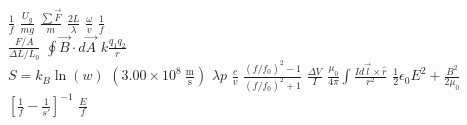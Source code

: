 \documentclass{article}
\begin{document}
$\frac{1}{f}$
$\frac{U_g}{mg}$
$\frac{\sum \vec F}{m}$
$\frac{2L}{\lambda}$
$\frac{\omega}{v}$
$\frac{1}{f}$ \\
$\frac{F/A}{\Delta L/L_0}$
$\oint \vec B \cdot d\vec A$
$k \frac{q_1 q_2}{r}$ \\
$S = k_B \ln(w)$
$(3.00 \times 10^8~\mathrm{\frac m s})$
$\lambda p$
$\frac{c}{v}$
$\frac{(f/f_0)^2 - 1}{(f/f_0)^2 + 1}$
$\frac{\Delta V}{I}$
$\frac{\mu_0}{4\pi} \int\frac{I d\vec l \times \hat r}{r^2}$
$\frac 1 2 \epsilon_0 E^2 + \frac{B^2}{2\mu_0}$
$\left[ \frac{1}{f} - \frac{1}{s'} \right]^{-1}$
$\frac{E}{f}$
\end{document}
